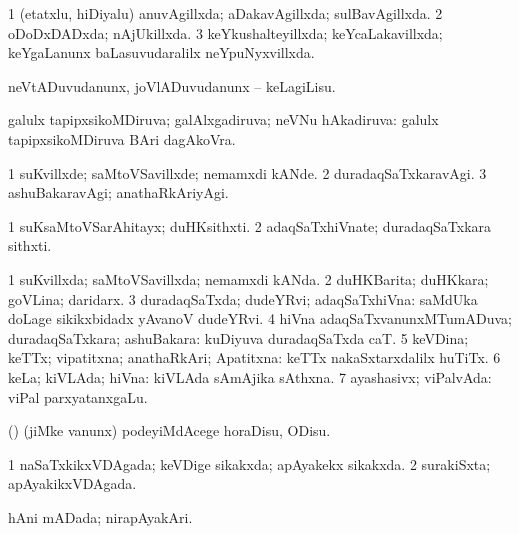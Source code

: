 {\bentry
{} 
\gl{\gu}
\bmng
\bnum
\num{1} (etatxlu, hiDiyalu) anuvAgillxda; aDakavAgillxda; sulBavAgillxda. 
\num{2} oDoDxDADxda; nAjUkillxda. 
\num{3} keYkushalteyillxda; keYcaLakavillxda; keYgaLanunx baLasuvudaralilx neYpuNyxvillxda. 
\enum
\emng
\eentry

\bentry
{} 
\gl{\akirx}
\bmng
neVtADuvudanunx, joVlADuvudanunx -- keLagiLisu. 
\emng
\eentry

\bentry
{} 
\gl{\gu}
\expl{}
\bmng
galulx tapipxsikoMDiruva; galAlxgadiruva; neVNu hAkadiruva:  galulx tapipxsikoMDiruva BAri dagAkoVra. 
\emng
\eentry

\bentry
{} 
\gl{\kirxvi}
\bmng
\bnum
\num{1} suKvillxde; saMtoVSavillxde; nemamxdi kANde. 
\num{2} duradaqSaTxkaravAgi. 
\num{3} ashuBakaravAgi; anathaRkAriyAgi. 
\enum
\emng
\eentry

\bentry
{} 
\gl{\nA}
\expl{}
\bmng
\bnum
\num{1} suKsaMtoVSarAhitayx; duHKsithxti. 
\num{2} adaqSaTxhiVnate; duradaqSaTxkara sithxti. 
\enum
\emng
\eentry

\bentry
{} 
\gl{\gu}
\bmng
\bnum
\num{1} suKvillxda; saMtoVSavillxda; nemamxdi kANda. 
\num{2} duHKBarita; duHKkara; goVLina; daridarx. 
\num{3} duradaqSaTxda; dudeYRvi; adaqSaTxhiVna:  saMdUka doLage sikikxbidadx yAvanoV dudeYRvi. 
\num{4} hiVna adaqSaTxvanunxMTumADuva; duradaqSaTxkara; ashuBakara:  kuDiyuva duradaqSaTxda caT. 
\num{5} keVDina; keTTx; vipatitxna; anathaRkAri; Apatitxna:  keTTx nakaSxtarxdalilx huTiTx. 
\num{6} keLa; kiVLAda; hiVna:  kiVLAda sAmAjika sAthxna. 
\num{7} ayashasivx; viPalvAda:  viPal parxyatanxgaLu. 
\enum
\emng
\eentry

\bentry
{} 
\gl{\sakirx}
\expl{}
\bmng
(\birx) (jiMke \mo vanunx) podeyiMdAcege horaDisu, ODisu. 
\emng
\eentry

\bentry
{} 
\gl{\gu}
\expl{}
\bmng
\bnum
\num{1} naSaTxkikxVDAgada; keVDige sikakxda; apAyakekx sikakxda. 
\num{2} surakiSxta; apAyakikxVDAgada. 
\enum
\emng
\eentry

\bentry
{} 
\gl{\gu}
\expl{}
\bmng
hAni mADada; nirapAyakAri. 
\emng
\eentry

}
